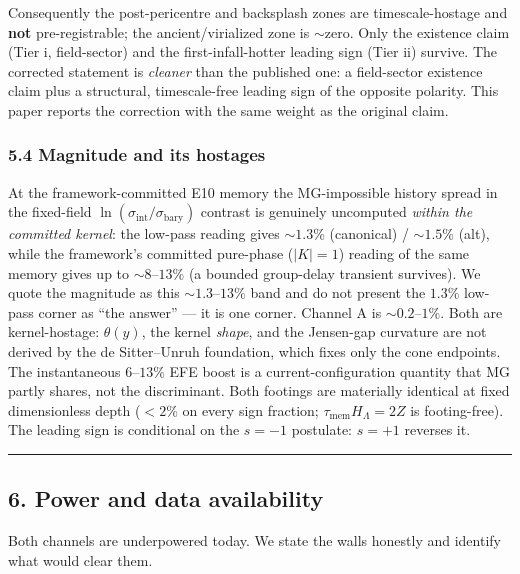 \documentclass[
]{article}
\begin{document}
Consequently the post-pericentre and backsplash zones are
timescale-hostage and \textbf{not} pre-registrable; the
ancient/virialized zone is \(\sim\)zero. Only the existence claim (Tier
i, field-sector) and the first-infall-hotter leading sign (Tier ii)
survive. The corrected statement is \emph{cleaner} than the published
one: a field-sector existence claim plus a structural, timescale-free
leading sign of the opposite polarity. This paper reports the correction
with the same weight as the original claim.

\subsubsection{5.4 Magnitude and its
hostages}\label{magnitude-and-its-hostages}

At the framework-committed E10 memory the MG-impossible history spread
in the fixed-field \(\ln(\sigma_\mathrm{int}/\sigma_\mathrm{bary})\) contrast
is genuinely uncomputed \emph{within the committed kernel}: the low-pass
reading gives \(\sim1.3\%\) (canonical) / \(\sim1.5\%\) (alt), while the
framework's committed pure-phase (\(|K|=1\)) reading of the same memory
gives up to \(\sim8\)--\(13\%\) (a bounded group-delay transient
survives). We quote the magnitude as this \(\sim1.3\)--\(13\%\) band and
do not present the \(1.3\%\) low-pass corner as ``the answer'' --- it is
one corner. Channel A is \(\sim0.2\)--\(1\%\). Both are kernel-hostage:
\(\theta(y)\), the kernel \emph{shape}, and the Jensen-gap curvature are
not derived by the de Sitter--Unruh foundation, which fixes only the
cone endpoints. The instantaneous \(6\)--\(13\%\) EFE boost is a
current-configuration quantity that MG partly shares, not the
discriminant. Both footings are materially identical at fixed
dimensionless depth (\(<2\%\) on every sign fraction;
\(\tau_\mathrm{mem}H_\Lambda=2Z\) is footing-free). The leading sign is
conditional on the \(s=-1\) postulate: \(s=+1\) reverses it.

\begin{center}\rule{0.5\linewidth}{0.5pt}\end{center}

\subsection{6. Power and data
availability}\label{power-and-data-availability}

Both channels are underpowered today. We state the walls honestly and
identify what would clear them.
\end{document}
